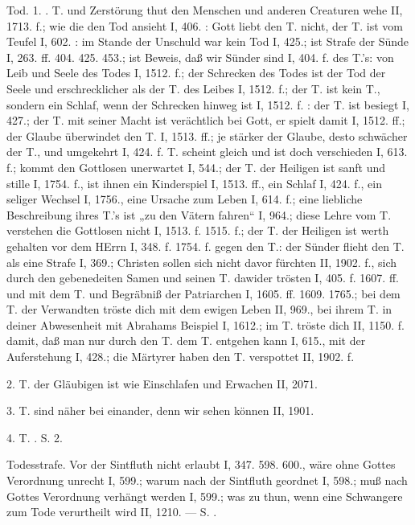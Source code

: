 Tod. 1. . T. und Zerstörung thut den Menschen und anderen Creaturen wehe II, 1713. f.; wie die  den Tod ansieht I, 406. : Gott liebt den T. nicht, der T. ist vom Teufel I, 602. : im Stande der Unschuld war kein Tod I, 425.; ist Strafe der Sünde I, 263. ff. 404. 425. 453.; ist Beweis, daß wir Sünder sind I, 404. f.  des T.’s: von Leib und Seele des Todes I, 1512. f.; der Schrecken des Todes ist der Tod der Seele und erschrecklicher als der T. des Leibes I, 1512. f.; der T. ist kein T., sondern ein Schlaf, wenn der Schrecken hinweg ist I, 1512. f. : der T. ist besiegt I, 427.; der T. mit seiner Macht ist verächtlich bei Gott, er spielt damit I, 1512. ff.; der Glaube überwindet den T. I, 1513. ff.; je stärker der Glaube, desto schwächer der T., und umgekehrt I, 424. f. T.  scheint gleich und ist doch verschieden I, 613. f.; kommt den Gottlosen unerwartet I, 544.; der T. der Heiligen ist sanft und stille I, 1754. f., ist ihnen ein Kinderspiel I, 1513. ff., ein Schlaf I, 424. f., ein seliger Wechsel I, 1756., eine Ursache zum Leben I, 614. f.; eine liebliche Beschreibung ihres T.’s ist „zu den Vätern fahren“ I, 964.; diese Lehre vom T. verstehen die Gottlosen nicht I, 1513. f. 1515. f.; der T. der Heiligen ist werth gehalten vor dem HErrn I, 348. f. 1754. f.  gegen den T.: der Sünder flieht den T. als eine Strafe I, 369.; Christen sollen sich nicht davor fürchten II, 1902. f., sich durch den gebenedeiten Samen und seinen T. dawider trösten I, 405. f. 1607. ff. und mit dem T. und Begräbniß der Patriarchen I, 1605. ff. 1609. 1765.; bei dem T. der Verwandten tröste dich mit dem ewigen Leben II, 969., bei ihrem T. in deiner Abwesenheit mit Abrahams Beispiel I, 1612.; im T. tröste dich II, 1150. f. damit, daß man nur durch den T. dem T. entgehen kann I, 615., mit der Auferstehung I, 428.; die Märtyrer haben den T. verspottet II, 1902. f.

2. T.  der Gläubigen ist wie Einschlafen und Erwachen II, 2071.

3. T.  sind näher bei einander, denn wir sehen können II, 1901.

4. T. . S.  2.

Todesstrafe. Vor der Sintfluth nicht erlaubt I, 347. 598. 600., wäre ohne Gottes Verordnung unrecht I, 599.; warum nach der Sintfluth geordnet I, 598.; muß nach Gottes Verordnung verhängt werden I, 599.; was zu thun, wenn eine Schwangere zum Tode verurtheilt wird II, 1210. — S. .

